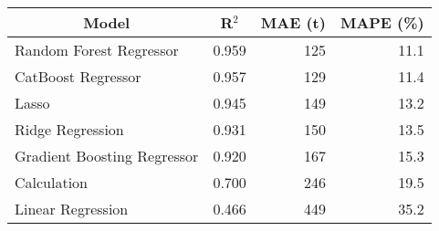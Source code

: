 
\begin{tabular}[t]{lrrr}
\toprule
\multicolumn{1}{c}{Model} & \multicolumn{1}{c}{R$^2$} & \multicolumn{1}{c}{MAE (t)} & \multicolumn{1}{c}{MAPE (\%)}\\
\midrule
Random Forest Regressor & 0.959 & 125 & 11.1\\
CatBoost Regressor & 0.957 & 129 & 11.4\\
Lasso & 0.945 & 149 & 13.2\\
Ridge Regression & 0.931 & 150 & 13.5\\
Gradient Boosting Regressor & 0.920 & 167 & 15.3\\
Calculation & 0.700 & 246 & 19.5\\
Linear Regression & 0.466 & 449 & 35.2\\
\bottomrule
\end{tabular}
